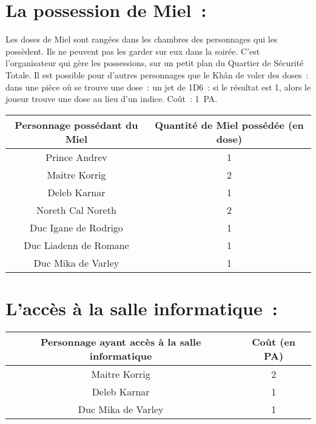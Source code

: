 \documentclass{article}
\begin{document}
\section*{La possession de Miel~:}

Les doses de Miel sont rangées dans les chambres des personnages qui les
possèdent. Ils ne peuvent pas les garder sur eux dans la soirée. C'est
l'organisateur qui gère les possessions, sur un petit plan du Quartier de
Sécurité Totale. Il est possible pour d'autres personnages que le Khân de
voler des doses~: dans une pièce où se trouve une dose~: un jet de 1D6~: si
le résultat est 1, alors le joueur trouve une dose au lieu d'un indice. Coût~:
1~PA.

\begin{center}
    \begin{tabular}{|c|c|}
        \hline
        Personnage possédant du Miel & Quantité de Miel possédée (en dose)\\
        \hline
        Prince Andrev & 1 \\
        Maitre Korrig & 2 \\
        Deleb Karnar & 1 \\
        Noreth Cal Noreth & 2 \\
        Duc Igane de Rodrigo & 1 \\
        Duc Liadenn de Romane & 1 \\
        Duc Mika de Varley & 1 \\
        \hline
    \end{tabular}
\end{center}

\section*{L'accès à la salle informatique~:}
\begin{center}
    \begin{tabular}{|c|c|}
        \hline
        Personnage ayant accès à la salle informatique & Coût (en PA)\\
        \hline
        Maitre Korrig & 2 \\
        Deleb Karnar & 1 \\
        Duc Mika de Varley & 1 \\
        \hline
    \end{tabular}
\end{center}
\end{document}
